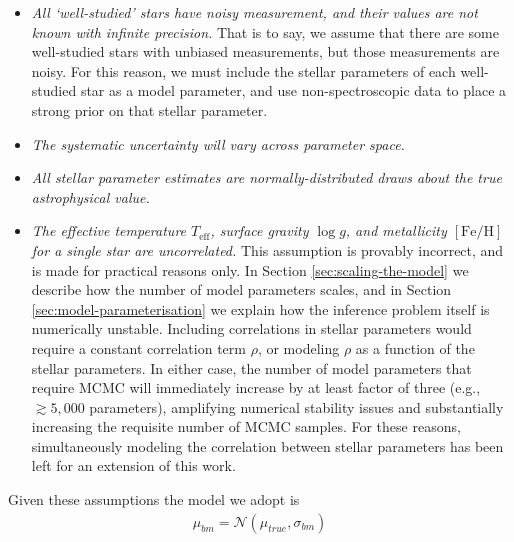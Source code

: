 \documentclass[preprint]{aastex}
\newcommand{\teff}{T_{\mathrm{eff}}}
\newcommand{\logg}{\log g}
\newcommand{\feh}{[\mathrm{Fe/H}]}
\newcommand{\normal}[2]{\mathcal{N}\left(#1, #2\right)}
\begin{document}
\begin{itemize}
    \item   \emph{All `well-studied' stars have noisy measurement, and their values
            are not known with infinite precision.} That is to say, we assume that there
            are some well-studied stars with unbiased measurements, but those
            measurements are noisy. For this reason, we must include the stellar
            parameters of each well-studied star as a model parameter, and use 
            non-spectroscopic data to place a strong prior on that stellar parameter.
            
    \item   \emph{The systematic uncertainty will vary across parameter space.}

    \item   \emph{All stellar parameter estimates are normally-distributed draws about 
            the true astrophysical value.}

    \item   \emph{The effective temperature $\teff$, surface gravity $\logg$, and
            metallicity $\feh$ for a single star are uncorrelated.}
            This assumption is provably incorrect, and is made for practical reasons
            only. In Section \ref{sec:scaling-the-model} we describe how the number
            of model parameters scales, and in Section \ref{sec:model-parameterisation}
            we explain how the inference problem itself is numerically unstable.
            Including correlations in stellar parameters would require a constant
            correlation term $\rho$, or modeling $\rho$ as a function of the stellar
            parameters. In either case, the number of model parameters that require
            MCMC will immediately increase by at least factor of three (e.g.,
            $\gtrsim5{,}000$ parameters), amplifying numerical stability issues and
            substantially increasing the requisite number of MCMC samples. For these
            reasons, simultaneously modeling the correlation between stellar
            parameters has been left for an extension of this work.
 
\end{itemize}

Given these assumptions the model we adopt is
\begin{eqnarray}
    \mu_{bm} = \normal{\mu_{true}}{\sigma_{bm}} 
\end{eqnarray} 


\end{document}
